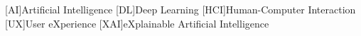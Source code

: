 
\begin{acronym}[H.264/SVC]
[AI]{Artificial Intelligence}
[DL]{Deep Learning}
[HCI]{Human-Computer Interaction}
[UX]{User eXperience}
[XAI]{eXplainable Artificial Intelligence}
\end{acronym}